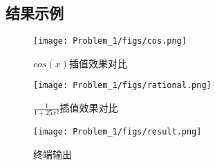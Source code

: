 \subsection{结果示例}
\begin{figure}[H]
    \centering
    \texttt{[image: Problem\_1/figs/cos.png]}
    \caption{$cos(x)$插值效果对比}
\end{figure}

\begin{figure}[H]
    \centering
    \texttt{[image: Problem\_1/figs/rational.png]}
    \caption{$\frac{1}{1+25x^2}$插值效果对比}
\end{figure}

\begin{figure}[H]
    \centering
    \texttt{[image: Problem\_1/figs/result.png]}
    \caption{终端输出}
\end{figure}

